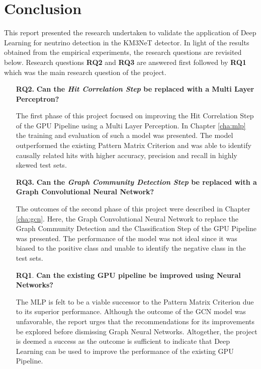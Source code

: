 
\chapter{Conclusion} %

% 

This report presented the research undertaken to validate the
application of Deep Learning for neutrino detection in the KM3NeT
detector. In light of the results obtained from the empirical
experiments, the research questions are revisited below. Research
questions \textbf{RQ2} and \textbf{RQ3} are answered first followed by
\textbf{RQ1} which was the main research question of the project.

\begin{enumerate}
\item[\textbf{RQ2.}] \textbf{Can the \emph{Hit Correlation Step} be replaced with a Multi Layer Perceptron?}

  The first phase of this project focused on improving the Hit
  Correlation Step of the GPU Pipeline using a Multi Layer Perception.
  In Chapter \ref{cha:mlp} the training and evaluation of such a model
  was presented. The model outperformed the existing Pattern Matrix
  Criterion and was able to identify causally related hits with higher
  accuracy, precision and recall in highly skewed test sets.

\item[\textbf{RQ3.}] \textbf{Can the \emph{Graph Community Detection Step} be replaced with a Graph Convolutional Neural Network?}

  The outcomes of the second phase of this project were described in
  Chapter \ref{cha:gcn}. Here, the Graph Convolutional Neural Network
  to replace the Graph Community Detection and the Classification Step
  of the GPU Pipeline was presented. The performance of the model was
  not ideal since it was biased to the positive class and unable to
  identify the negative class in the test sets.

\item[\textbf{RQ1}.] \textbf{Can the existing GPU pipeline be improved using Neural Networks?}

  The MLP is felt to be a viable successor to the Pattern Matrix
  Criterion due to its superior performance. Although the outcome of
  the GCN model was unfavorable, the report urges that the
  recommendations for its improvements be explored before dismissing
  Graph Neural Networks. Altogether, the project is deemed a success
  as the outcome is sufficient to indicate that Deep Learning can be
  used to improve the performance of the existing GPU Pipeline.
\end{enumerate}


